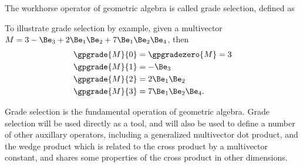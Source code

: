 %
%
The workhorse operator of geometric algebra is called grade selection, defined as

To illustrate grade selection by example, given a multivector \( M = 3 - \Be_3 + 2 \Be_1 \Be_2 + 7 \Be_1 \Be_2 \Be_4 \), then
\begin{equation}\label{eqn:multivector_nomenclature:80}
\begin{aligned}
\gpgrade{M}{0} &= \gpgradezero{M} = 3 \\
\gpgrade{M}{1} &= - \Be_3 \\
\gpgrade{M}{2} &= 2 \Be_1 \Be_2 \\
\gpgrade{M}{3} &= 7 \Be_1 \Be_2 \Be_4.
\end{aligned}
\end{equation}

Grade selection is the fundamental operation of geometric algebra.  Grade selection will be used directly as a tool, and will
also be used to define a number of other auxillary operators,
including a 
generalized multivector dot product, and the wedge product which is related to the  cross product by a multivector constant, and shares some properties of the cross product in other dimensions.
